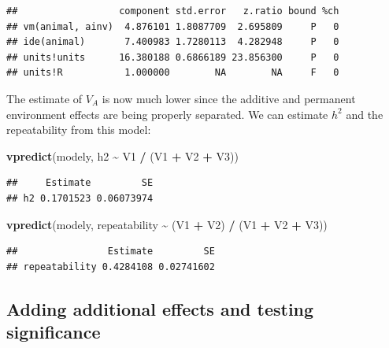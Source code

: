 \documentclass[
  12pt,
]{book}
\newenvironment{Shaded}{\begin{snugshade}}{\end{snugshade}}
\newcommand{\KeywordTok}[1]{\textcolor[rgb]{0.13,0.29,0.53}{\textbf{#1}}}
\newcommand{\NormalTok}[1]{#1}
\newcommand{\OperatorTok}[1]{\textcolor[rgb]{0.81,0.36,0.00}{\textbf{#1}}}
\newcommand{\StringTok}[1]{\textcolor[rgb]{0.31,0.60,0.02}{#1}}
\begin{document}
\begin{Shaded}
\end{Shaded}

\begin{verbatim}
##                  component std.error   z.ratio bound %ch
## vm(animal, ainv)  4.876101 1.8087709  2.695809     P   0
## ide(animal)       7.400983 1.7280113  4.282948     P   0
## units!units      16.380188 0.6866189 23.856300     P   0
## units!R           1.000000        NA        NA     F   0
\end{verbatim}

The estimate of \(V_A\) is now much lower since the additive and permanent environment effects are being properly separated. We can estimate \(h^2\) and the repeatability from this model:

\begin{Shaded}
\begin{Highlighting}[]
\KeywordTok{vpredict}\NormalTok{(modely, h2 }\OperatorTok{\textasciitilde{}}\StringTok{ }\NormalTok{V1 }\OperatorTok{/}\StringTok{ }\NormalTok{(V1 }\OperatorTok{+}\StringTok{ }\NormalTok{V2 }\OperatorTok{+}\StringTok{ }\NormalTok{V3))}
\end{Highlighting}
\end{Shaded}

\begin{verbatim}
##     Estimate         SE
## h2 0.1701523 0.06073974
\end{verbatim}

\begin{Shaded}
\begin{Highlighting}[]
\KeywordTok{vpredict}\NormalTok{(modely, repeatability }\OperatorTok{\textasciitilde{}}\StringTok{ }\NormalTok{(V1 }\OperatorTok{+}\StringTok{ }\NormalTok{V2) }\OperatorTok{/}\StringTok{ }\NormalTok{(V1 }\OperatorTok{+}\StringTok{ }\NormalTok{V2 }\OperatorTok{+}\StringTok{ }\NormalTok{V3))}
\end{Highlighting}
\end{Shaded}

\begin{verbatim}
##                Estimate         SE
## repeatability 0.4284108 0.02741602
\end{verbatim}

\hypertarget{adding-additional-effects-and-testing-significance}{%
\subsection{Adding additional effects and testing significance}\label{adding-additional-effects-and-testing-significance}}
\end{document}
